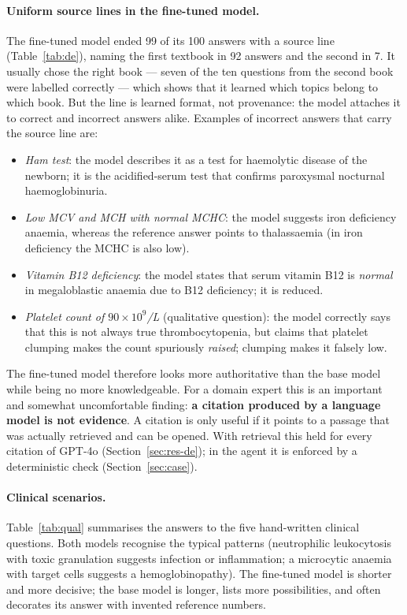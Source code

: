 \paragraph{Uniform source lines in the fine-tuned model.} The fine-tuned model ended 99 of its 100 answers with a source line (Table~\ref{tab:de}), naming the first textbook in 92 answers and the second in 7. It usually chose the right book --- seven of the ten questions from the second book were labelled correctly --- which shows that it learned which topics belong to which book. But the line is learned format, not provenance: the model attaches it to correct and incorrect answers alike. Examples of incorrect answers that carry the source line are:

\begin{itemize}
  \item \emph{Ham test}: the model describes it as a test for haemolytic disease of the newborn; it is the acidified-serum test that confirms paroxysmal nocturnal haemoglobinuria.
  \item \emph{Low MCV and MCH with normal MCHC}: the model suggests iron deficiency anaemia, whereas the reference answer points to thalassaemia (in iron deficiency the MCHC is also low).
  \item \emph{Vitamin B12 deficiency}: the model states that serum vitamin B12 is \emph{normal} in megaloblastic anaemia due to B12 deficiency; it is reduced.
  \item \emph{Platelet count of $90 \times 10^9$/L} (qualitative question): the model correctly says that this is not always true thrombocytopenia, but claims that platelet clumping makes the count spuriously \emph{raised}; clumping makes it falsely low.
\end{itemize}

The fine-tuned model therefore looks more authoritative than the base model while being no more knowledgeable. For a domain expert this is an important and somewhat uncomfortable finding: \textbf{a citation produced by a language model is not evidence}. A citation is only useful if it points to a passage that was actually retrieved and can be opened. With retrieval this held for every citation of GPT-4o (Section~\ref{sec:res-de}); in the agent it is enforced by a deterministic check (Section~\ref{sec:case}).

\paragraph{Clinical scenarios.} Table~\ref{tab:qual} summarises the answers to the five hand-written clinical questions. Both models recognise the typical patterns (neutrophilic leukocytosis with toxic granulation suggests infection or inflammation; a microcytic anaemia with target cells suggests a hemoglobinopathy). The fine-tuned model is shorter and more decisive; the base model is longer, lists more possibilities, and often decorates its answer with invented reference numbers.

